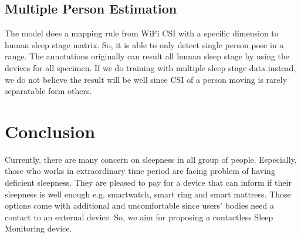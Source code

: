 \documentclass[10pt,letterpaper]{article}
\begin{document}
	
	
	\subsection*{Multiple Person Estimation}
	
	The model does a mapping rule from WiFi CSI with a specific dimension to human sleep stage matrix. So, it is able to only detect single person pose in a range. The annotations originally can result all human sleep stage by using the devices for all specimen. If we do training with multiple sleep stage data instead, we do not believe the result will be well since CSI of a person moving is rarely separatable form others.
	

	
	\section*{Conclusion}
	

	Currently, there are many concern on sleepness in all group of people. Especially, those who works in extraordinary time period are facing problem of having deficient sleepness. They are pleased to pay for a device that can inform if their sleepness is well enough e.g. smartwatch, smart ring and smart mattress. Those options come with additional and uncomfortable since users' bodies need a contact to an external device. So, we aim for proposing a contactless Sleep Monitoring device.
	
\end{document}
